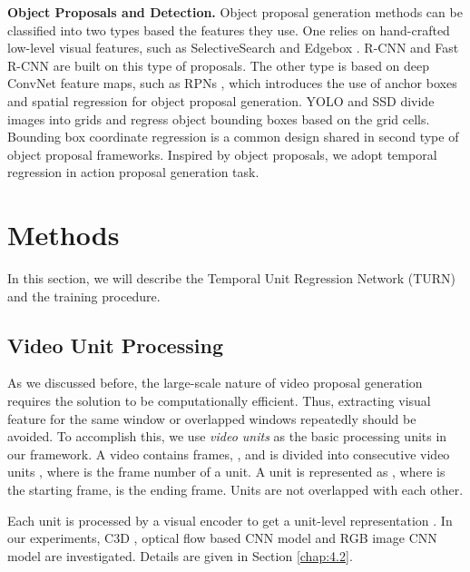 \documentclass[10pt,twocolumn,letterpaper]{article}
\begin{document}
\textbf{Object Proposals and Detection.} 
Object proposal generation methods can be classified into two types based the features they use. One relies on hand-crafted low-level visual features, such as SelectiveSearch \cite{uijlings2013selective} and Edgebox \cite{zitnick2014edge}. R-CNN \cite{Girshick_2014_CVPR} and Fast R-CNN \cite{girshick2015fast} are built on this type of proposals. The other type is based on deep ConvNet feature maps, such as RPNs \cite{ren2015faster}, which introduces the use of anchor boxes and spatial regression for object proposal generation. YOLO \cite{Redmon_2016_CVPR} and SSD \cite{liu2015ssd} divide images into grids and regress object bounding boxes based on the grid cells. Bounding box coordinate regression is a common design shared in second type of object proposal frameworks. Inspired by object proposals, we adopt temporal regression in action proposal generation task.
 






\section{Methods}


In this section, we will describe the Temporal Unit Regression Network (TURN) and the training procedure.  

\subsection{Video Unit Processing} \label{sec:unit processing}
As we discussed before, the large-scale nature of video proposal generation requires the solution to be computationally efficient. Thus, extracting visual feature for the same window or overlapped windows repeatedly should be avoided. To accomplish this, we use \emph{video units} as the basic processing units in our framework. A video  contains  frames, , and is divided into  consecutive video units , where  is the frame number of a unit. A unit is represented as , where  is the starting frame,  is the ending frame. Units are not overlapped with each other.  

Each unit is processed by a visual encoder  to get a unit-level representation . In our experiments, C3D \cite{tran2015learning}, optical flow based CNN model and RGB image CNN model \cite{simonyan2014two} are investigated. Details are given in Section \ref{chap:4.2}.
\end{document}
